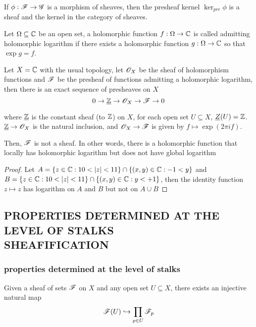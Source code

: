 \begin{proposition}
	If $\phi: \mathscr{F} \to \mathscr{G}$ is a morphism of sheaves, then the presheaf kernel $\ker_{pre} \phi$ is a sheaf and the kernel in the category of sheaves.
\end{proposition}

\begin{remark}
	Let $\Omega \subseteq \mathbb{C}$ be an open set, a holomorphic function $f: \Omega \to \mathbb{C}$ is called admitting holomorphic logarithm if there exists a holomorphic function $g: \Omega \to \mathbb{C}$ so that $\exp g = f$.
	
	Let $X = \mathbb{C}$ with the usual topology, let $\mathscr{O}_X$ be the sheaf of holomorphism functions and $\mathscr{F}$ be the presheaf of functions admitting a holomorphic logarithm, then there is an exact sequence of presheaves on $X$
	$$
		0 \to \underline{\mathbb{Z}} \to \mathscr{O}_X \to \mathscr{F} \to 0
	$$
	
	where $\underline{\mathbb{Z}}$ is the constant sheaf (to $\mathbb{Z}$) on $X$, for each open set $U \subseteq X$, $\underline{Z}(U) = \mathbb{Z}$. $\underline{\mathbb{Z}} \to \mathscr{O}_X$ is the natural inclusion, and $\mathscr{O}_X \to \mathscr{F}$ is given by $f \mapsto \exp(2 \pi i f)$.
	
	Then, $\mathscr{F}$ is not a sheaf. In other words, there is a holomorphic function that locally has holomorphic logarithm but does not have global logarithm
\end{remark}

\begin{proof}
	Let $A = \{z \in \mathbb{C}: 10 < |z| < 11\} \cap \{(x, y) \in \mathbb{C}: -1 < y\}$ and $B = \{z \in \mathbb{C}: 10 < |z| < 11\} \cap \{(x, y) \in \mathbb{C}: y < +1\}$, then the identity function $z \mapsto z$ has logarithm on $A$ and $B$ but not on $A \cup B$
\end{proof}

\subsection{PROPERTIES DETERMINED AT THE LEVEL OF STALKS \\ SHEAFIFICATION}

\subsubsection{properties determined at the level of stalks}

\begin{proposition}
	Given a sheaf of sets $\mathscr{F}$ on $X$ and any open set $U \subseteq X$, there exists an injective natural map
	$$
		\mathscr{F}(U) \hookrightarrow \prod_{p \in U} \mathscr{F}_p
	$$
\end{proposition}

